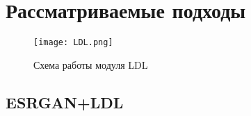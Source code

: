 \documentclass[14pt]{extarticle}
\begin{document}





\section{Рассматриваемые подходы}

\begin{figure}
    \centering
    \texttt{[image: LDL.png]}
    \caption{Схема работы модуля LDL}
    \label{fig:LDL}
\end{figure}

\subsection{ESRGAN+LDL}
\end{document}

